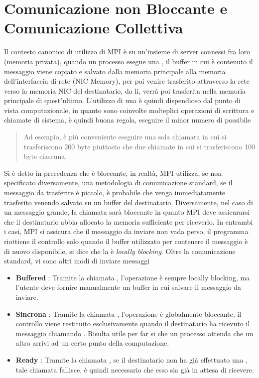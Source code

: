\documentclass[10pt, letterpaper]{report}
\begin{document}
\section{Comunicazione  non Bloccante e Comunicazione Collettiva}
Il contesto canonico di utilizzo di MPI è su un'insieme di server connessi fra loro (memoria privata), quando un 
processo esegue una , il buffer in cui è contenuto il messaggio viene copiato e salvato dalla memoria 
principale alla memoria dell'interfaccia di rete (NIC Memory), per poi venire trasferito attraverso la rete verso la memoria 
NIC del destinatario, da li, verrà poi trasferita nella memoria principale di quest'ultimo. \acc 
L'utilizzo di una  è quindi dispendioso dal punto di vista computazionale, in quanto sono coinvolte 
molteplici operazioni di scrittura e chiamate di sistema, è quindi buona regola, eseguire il minor numero di 
 possibile\begin{quote}
    \color{gray}
    Ad esempio, è più conveniente eseguire una sola chiamata in cui si trasferiscono 200 byte piuttosto che due chiamate 
    in cui si trasferiscono 100 byte ciascuna.
    \color{black}
\end{quote}
Si è detto in precedenza che  è bloccante, in realtà, MPI utilizza, se non specificato diversamente, 
una metodologia di comunicazione standard, se il messaggio da trasferire è piccolo, è probabile che venga immediatamente 
trasferito venendo salvato su un buffer del destinatario. Diversamente, nel caso di un messaggio grande, la chiamata 
sarà bloccante in quanto MPI deve assicurarsi che il destinatario abbia allocato la memoria sufficiente per riceverlo.\acc 
In entrambi i casi, MPI si assicura che il messaggio da inviare non vada perso, il programma riottiene il controllo 
solo quando il buffer utilizzato per contenere il messaggio è di nuovo disponibile, si dice che la  
è \textit{locally blocking}. Oltre la comunicazione standard, vi sono altri modi di inviare messaggi\begin{itemize}
    \item \textbf{Buffered} : Tramite la chiamata , l'operazione è sempre locally blocking, ma l'utente deve fornire manualmente un 
    buffer in cui salvare il messaggio da inviare. 
    \item \textbf{Sincrona} : Tramite la chiamata , l'operazione è globalmente bloccante, il controllo 
    viene restituito esclusivamente quando il destinatario ha ricevuto il messaggio chiamando . Risulta 
    utile per far si che un processo attenda che un altro arrivi ad un certo punto della computazione. 
    \item \textbf{Ready} : Tramite la chiamata , se il destinatario non ha già effettuato una 
    , tale chiamata fallisce, è quindi necessario che esso sia già in attesa di ricevere.
\end{itemize}
\end{document}
